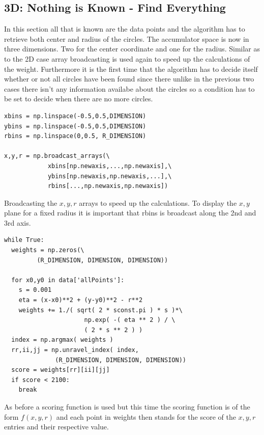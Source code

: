 \documentclass[11pt,twoside]{scrreprt}
\begin{document}
\subsection{3D: Nothing is Known - Find Everything} %
\label{sub:3d_nothing_is_known_find_everything}
In this section all that is known are the data points and the algorithm has to retrieve both center and radius of the circles. The accumulator space
is now in three dimensions. Two for the center coordinate and one for the radius. Similar as to the 2D case array broadcasting is used again
to speed up the calculations of the weight. Furthermore it is the first time that the algorithm has to decide itself whether or not all circles have
been found since there unlike in the previous two cases there isn't any information availabe about the circles so a condition has to be set
to decide when there are no more circles.
\begin{lstlisting}
xbins = np.linspace(-0.5,0.5,DIMENSION)
ybins = np.linspace(-0.5,0.5,DIMENSION)
rbins = np.linspace(0,0.5, R_DIMENSION)

x,y,r = np.broadcast_arrays(\
            xbins[np.newaxis,...,np.newaxis],\
            ybins[np.newaxis,np.newaxis,...],\
            rbins[...,np.newaxis,np.newaxis])
\end{lstlisting}
Broadcasting the $x,y,r$ arrays to speed up the calculations. To display the $x,y$ plane for a fixed radius it is important that rbins is
broadcast along the 2nd and 3rd axis. 
\begin{lstlisting}
while True:
  weights = np.zeros(\
         (R_DIMENSION, DIMENSION, DIMENSION))

  for x0,y0 in data['allPoints']:
    s = 0.001
    eta = (x-x0)**2 + (y-y0)**2 - r**2
    weights += 1./( sqrt( 2 * sconst.pi ) * s )*\
                      np.exp( -( eta ** 2 ) / \
                      ( 2 * s ** 2 ) )
  index = np.argmax( weights )
  rr,ii,jj = np.unravel_index( index, 
              (R_DIMENSION, DIMENSION, DIMENSION))
  score = weights[rr][ii][jj]
  if score < 2100:
    break  
\end{lstlisting}
As before a scoring function is used but this time the scoring function is of the form $f(x,y,r)$ and each point in weights then stands for the score of the
$x,y,r$ entries and their respective value.
\end{document}

